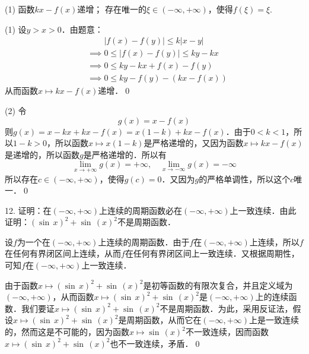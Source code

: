 \begin{tasks}(1)
    \task 函数$kx - f(x)$递增；
    \task 存在唯一的$\xi \in (-\infty, +\infty)$，使得$f(\xi) = \xi$.
\end{tasks}

(1) \prove 设$y > x > 0$．由题意：
\begin{align}
    &\mathrel{\phantom{\implies}} \lvert f(x) - f(y) \rvert \leq k \lvert x - y \rvert \\
    &\implies 0 \leq \lvert f(x) - f(y) \rvert \leq ky - kx \\ 
    &\implies 0 \leq ky - kx + f(x) - f(y) \\
    &\implies 0 \leq ky - f(y) - (kx - f(x))
\end{align}
从而函数$x \mapsto kx - f(x)$递增．\qed\bigskip

(2) \prove 令
\begin{equation}
    g(x) = x - f(x)
\end{equation}
则$g(x) = x - kx + kx - f(x) = x(1-k) + kx - f(x)$．由于$0 < k < 1$，所以$1-k > 0$，所以函数$x \mapsto x(1-k)$是严格递增的，又因为函数$x \mapsto kx - f(x)$是递增的，所以函数$g$是严格递增的．所以有
\begin{equation}
    \lim_{x \to +\infty} g(x) = +\infty, \quad \lim_{x \to -\infty} g(x) = -\infty
\end{equation}
所以存在$c \in (-\infty, +\infty)$，使得$g(c) = 0$．又因为$g$的严格单调性，所以这个$c$唯一．\qed\bigskip

12. 证明：在$(-\infty, +\infty)$上连续的周期函数必在$(-\infty, +\infty)$上一致连续．由此证明：$\left(\sin \, x\right)^2 + \sin \, \left(x\right)^2$不是周期函数．

\prove 设$f$为一个在$(-\infty,+\infty)$上连续的周期函数．由于$f$在$(-\infty,+\infty)$上连续，所以$f$在任何有界闭区间上连续，从而$f$在任何有界闭区间上一致连续．又根据周期性，可知$f$在$(-\infty,+\infty)$上一致连续．

由于函数$x \mapsto \left( \sin \, x\right)^2 + \sin \, \left(x\right)^2$是初等函数的有限次复合，并且定义域为$(-\infty, +\infty)$，从而函数$x \mapsto \left(\sin \, x\right)^2 + \sin \, \left(x\right)^2$是$(-\infty, +\infty)$上的连续函数．我们要证$x \mapsto \left(\sin \, x\right)^2 + \sin \, \left(x\right)^2$不是周期函数．为此，采用反证法，假设$x \mapsto \left(\sin \, x\right)^2 + \sin \, \left(x\right)^2$是周期函数，从而它在$(-\infty,+\infty)$上是一致连续的，然而这是不可能的，因为函数$x \mapsto \sin \, \left(x\right)^2$不一致连续，因而函数$x \mapsto \left(\sin \, x\right)^2 + \sin \, \left(x\right)^2$也不一致连续，矛盾．\qed\bigskip
